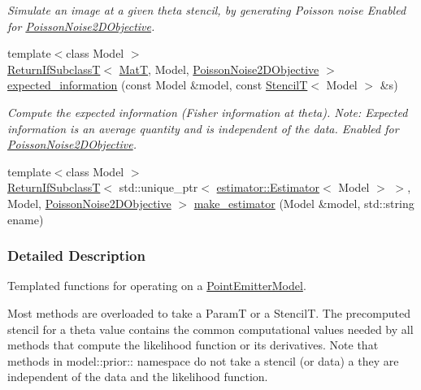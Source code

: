 \begin{DoxyCompactItemize}
\begin{DoxyCompactList}\small\item\em Simulate an image at a given theta stencil, by generating Poisson noise Enabled for \hyperlink{classmappel_1_1PoissonNoise2DObjective}{Poisson\+Noise2\+D\+Objective}. \end{DoxyCompactList}\item 
{\footnotesize template$<$class Model $>$ }\\\hyperlink{namespacemappel_a3b77d227658ba3ba9e16fea6fa6e626d}{Return\+If\+SubclassT}$<$ \hyperlink{namespacemappel_a7091ab87c528041f7e2027195fad8915}{MatT}, Model, \hyperlink{classmappel_1_1PoissonNoise2DObjective}{Poisson\+Noise2\+D\+Objective} $>$ \hyperlink{namespacemappel_1_1methods_abc7bb2a867d157f3adbb71abdd3680d2}{expected\+\_\+information} (const Model \&model, const \hyperlink{namespacemappel_a3a06598240007876f8c4bf834ad86197}{StencilT}$<$ Model $>$ \&s)
\begin{DoxyCompactList}\small\item\em Compute the expected information (Fisher information at theta). Note\+: Expected information is an average quantity and is independent of the data. Enabled for \hyperlink{classmappel_1_1PoissonNoise2DObjective}{Poisson\+Noise2\+D\+Objective}. \end{DoxyCompactList}\item 
{\footnotesize template$<$class Model $>$ }\\\hyperlink{namespacemappel_a3b77d227658ba3ba9e16fea6fa6e626d}{Return\+If\+SubclassT}$<$ std\+::unique\+\_\+ptr$<$ \hyperlink{classmappel_1_1estimator_1_1Estimator}{estimator\+::\+Estimator}$<$ Model $>$ $>$, Model, \hyperlink{classmappel_1_1PoissonNoise2DObjective}{Poisson\+Noise2\+D\+Objective} $>$ \hyperlink{namespacemappel_1_1methods_ad4cc5932e93e2c4c5218b1f7939a25ef}{make\+\_\+estimator} (Model \&model, std\+::string ename)
\end{DoxyCompactItemize}


\subsubsection{Detailed Description}
Templated functions for operating on a \hyperlink{classmappel_1_1PointEmitterModel}{Point\+Emitter\+Model}. 

Most methods are overloaded to take a ParamT or a StencilT. The precomputed stencil for a theta value contains the common computational values needed by all methods that compute the likelihood function or its derivatives. Note that methods in model\+::prior\+:\+: namespace do not take a stencil (or data) a they are independent of the data and the likelihood function.

